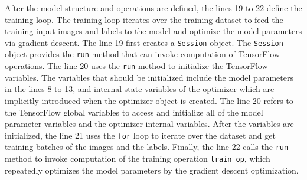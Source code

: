 After the model structure and operations are defined, 
the lines 19 to 22 define the training loop.
The training loop iterates over the training dataset to feed the training
input images and labels to the model and optimize the model parameters via
gradient descent.
The line 19 first creates a {\tt Session} object.
The {\tt Session} object provides the {\tt run} method that can invoke
computation of TensorFlow operations.
The line 20 uses the {\tt run} method to initialize the TensorFlow variables.
The variables that should be initialized
include the model parameters in the lines 8 to 13, and
internal state variables of the optimizer which are implicitly introduced
when the optimizer object is created.
The line 20 refers to the TensorFlow global variables to access and initialize
all of the model parameter variables and the optimizer internal variables.
After the variables are initialized, the line 21 uses the {\tt for} loop
to iterate over the dataset and get training batches of the images and the
labels. Finally, the line 22 calls the {\tt run} method to
invoke computation of the training operation {\tt train\_op},
which repeatedly optimizes the model parameters by the gradient descent
optimization.

